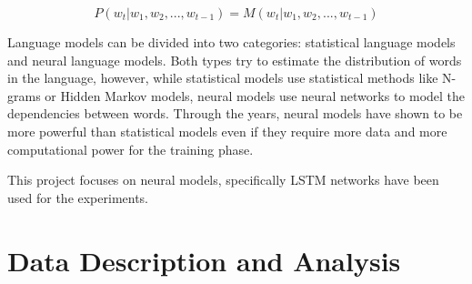 \documentclass[a4paper]{article}
\begin{document}
$$P(w_t | w_1, w_2, ..., w_{t-1}) = M(w_t | w_1, w_2, ..., w_{t-1})$$

Language models can be divided into two categories: statistical language models and neural language models. Both types try to estimate
the distribution of words in the language, however, while statistical models use statistical methods like N-grams or Hidden Markov models,
neural models use neural networks to model the dependencies between words.
Through the years, neural models have shown to be more powerful than statistical models even if they require more data and more
computational power for the training phase.

This project focuses on neural models, specifically LSTM networks have been used for the experiments.

\section{Data Description and Analysis}
\end{document}
